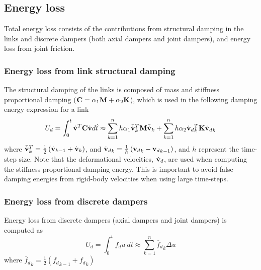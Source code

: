 \subsection{Energy loss}

Total energy loss consists of the contributions from structural damping 
in the links and discrete dampers (both axial dampers and joint dampers), and 
energy loss from joint friction.

\subsubsection{Energy loss from link structural damping}

The structural damping of the links is composed of mass and stiffness 
proportional damping  (${\bf C} = \alpha_{1}{\bf M}+\alpha_{2}{\bf K}$),
which is used in the following damping energy expression for a link
%
\begin{equation}
U_{d} = \int_{0}^{t} { \dot{\bf v}^{T}{\bf C}
\dot{\bf v} d {\hat t}} 
\approx \sum_{k = 1}^{n} h\alpha _{1}  \bar{\dot{{\bf v}}}_k^T{\bf M}\bar{\dot{{\bf v}}}_k 
+ \sum_{k = 1}^{n} h\alpha _{2}  {\dot{\bf v}{}_d}_{k}^T {\bf K}  {\dot{\bf v}{}_d}_k
\label{eqEC:89}
\end{equation}
%
\noindent
where 
$ \bar{\dot{{\bf v}}}_{k}^{T} = \frac{{1}}{{2}}\left(\dot{\bf v}_{k-1} 
                                           + \dot{\bf v}_{k}  \right)$,
and 
$ {\dot{\bf v}{}_d}_k = \frac{{1}}{{h}}\left( {{\bf v}_d}_{k} 
                                            - {{\bf v}_d}_{k-1} \right)$,
and 
${h}$ represent the time-step size.
%
Note that the deformational velocities, $ {\dot {\bf v}_d} $, are used
when computing the stiffness proportional damping 
energy. This is important to avoid false damping energies from 
rigid-body velocities when using large time-steps.

\subsubsection{Energy loss from discrete dampers}

Energy loss from discrete dampers (axial dampers and joint dampers) is 
computed as
%
\begin{equation}
U_{d} = \int_{0}^{t} f_{d}  {\dot u} \:dt \approx 
\sum_{k = 1}^{n} {\overline{f}{}_d}_k  \Delta u  
\label{eqEC:810}
\end{equation}
%
\noindent
where 
${\overline{f}{}_d}_k = \frac{1}{2}\left( {f_d}_{k-1} + 
{f_d}_k \right)$

